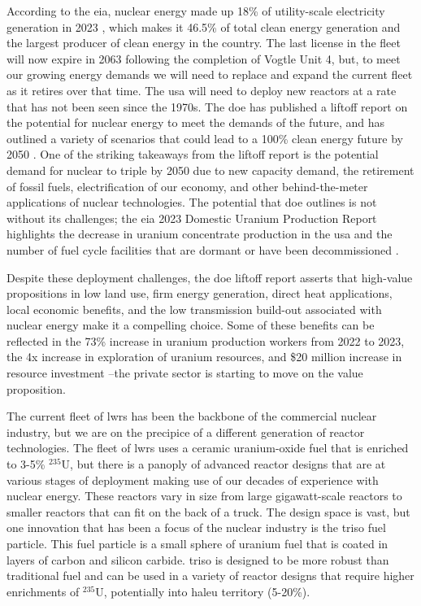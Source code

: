 According to the \gls{eia}, nuclear energy made up 18\% of utility-scale electricity generation in 2023 \cite{eia_elec_gen_2024}, which makes it 46.5\% of total clean energy generation and the largest producer of clean energy in the country. The last license in the fleet will now expire in 2063 following the completion of Vogtle Unit 4, but, to meet our growing energy demands we will need to replace and expand the current fleet as it retires over that time. The \gls{usa} will need to deploy new reactors at a rate that has not been seen since the 1970s. The \gls{doe} has published a liftoff report on the potential for nuclear energy to meet the demands of the future, and has outlined a variety of scenarios that could lead to a 100\% clean energy future by 2050 \cite{julie_liftoff_pathways_2024}. One of the striking takeaways from the liftoff report is the potential demand for nuclear to triple by 2050 due to new capacity demand, the retirement of fossil fuels, electrification of our economy, and other behind-the-meter applications of nuclear technologies. The potential that \gls{doe} outlines is not without its challenges; the \gls{eia} 2023 Domestic Uranium Production Report highlights the decrease in uranium concentrate production in the \gls{usa} and the number of fuel cycle facilities that are dormant or have been decommissioned \cite{eia_uranium_statistics_2023}.

Despite these deployment challenges, the \gls{doe} liftoff report asserts that high-value propositions in low land use, firm energy generation, direct heat applications, local economic benefits, and the low transmission build-out associated with nuclear energy make it a compelling choice. Some of these benefits can be reflected in the 73\% increase in uranium production workers from 2022 to 2023, the 4x increase in exploration of uranium resources, and \$20 million increase in resource investment \cite{eia_uranium_statistics_2023}--the private sector is starting to move on the value proposition.

The current fleet of \gls{lwr}s has been the backbone of the commercial nuclear industry, but we are on the precipice of a different generation of reactor technologies. The fleet of \gls{lwr}s uses a ceramic uranium-oxide fuel that is enriched to 3-5\% $^{235}$U, but there is a panoply of advanced reactor designs that are at various stages of deployment making use of our decades of experience with nuclear energy. These reactors vary in size from large gigawatt-scale reactors to smaller reactors that can fit on the back of a truck. The design space is vast, but one innovation that has been a focus of the nuclear industry is the \gls{triso} fuel particle. This fuel particle is a small sphere of uranium fuel that is coated in layers of carbon and silicon carbide. \gls{triso} is designed to be more robust than traditional fuel and can be used in a variety of reactor designs that require higher enrichments of $^{235}$U, potentially into \gls{haleu} territory (5-20\%).

